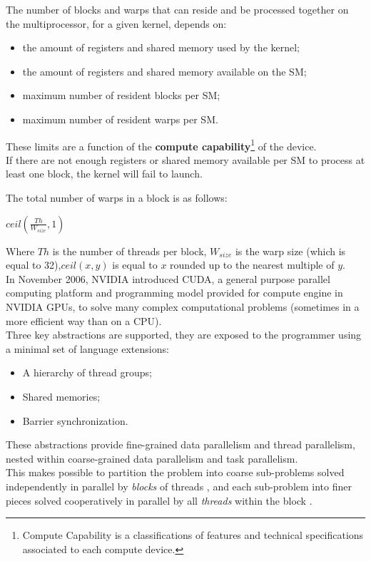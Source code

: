 	The number of blocks and warps that can reside and be processed together on the multiprocessor, for a given kernel, depends on:
	\begin{itemize}
		\item the amount of registers and shared memory used by the kernel;
		\item the amount of registers and shared memory available on the SM;
		\item maximum number of resident blocks per SM;
		\item maximum number of resident warps per SM.
	\end{itemize}
	These limits are a function of the \textbf{compute capability}\footnote{Compute Capability is a classifications of features and technical specifications associated to each compute device.} of the device.\\
	If there are not enough registers or shared memory available per SM to process at least one block, the kernel will fail to launch.
	
	The total number of warps in a block is as follows:
	\begin{center}
		\(ceil ( \frac{Th}{W_{size}}, 1 )\)
	\end{center}
	Where \(Th\) is the number of threads per block, \(W_{size}\) is the warp size (which is equal to 32),\(ceil (x, y)\) is equal to \(x\) rounded up to the nearest multiple of \(y\)\cite{cudaguide}.\\
	
	
	In November 2006, NVIDIA introduced CUDA, a general purpose parallel computing platform and programming model provided for compute engine in NVIDIA GPUs, to solve many complex computational problems (sometimes in a more efficient way than on a CPU).\\

	Three key abstractions are supported, they are exposed to the programmer using a minimal
	set of language extensions:
	\begin{itemize}
		\item A hierarchy of thread groups;
		
		\item Shared memories;
		
		\item Barrier synchronization.
	\end{itemize} 
	
	These abstractions provide fine-grained data parallelism and thread parallelism, nested within coarse-grained data parallelism and task parallelism.\\
	This makes possible to partition the problem into coarse sub-problems \textendash solved independently in parallel by \textit{blocks} of threads \textendash, and each sub-problem into finer pieces \textendash solved cooperatively in parallel by all \textit{threads} within the block \textendash.
	
